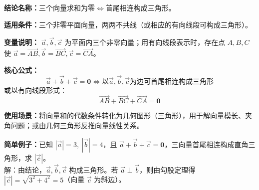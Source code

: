 \textbf{结论名称：}三个向量求和为零\(\iff\)首尾相连构成三角形。

\textbf{适用条件：}三个非零平面向量，两两不共线（或相应的有向线段可构成三角形）。

\textbf{变量说明：} \(\vec{a},\vec{b},\vec{c}\) 为平面内三个非零向量；用有向线段表示时，存在点 \(A,B,C\) 使 \(\vec{a}=\overrightarrow{AB},\vec{b}=\overrightarrow{BC},\vec{c}=\overrightarrow{CA}\)。

\textbf{核心公式：}
\[
\boxed{\vec{a} + \vec{b} + \vec{c} = \mathbf{0} \iff \text{以}\vec{a},\vec{b},\vec{c}\text{为边可首尾相连构成三角形}}
\]
或以有向线段形式：
\[
\boxed{\overrightarrow{AB} + \overrightarrow{BC} + \overrightarrow{CA} = \mathbf{0}}
\]

\textbf{使用场景：}将向量和的代数条件转化为几何图形（三角形），用于解向量模长、夹角问题；或由几何三角形反推向量线性关系。

\textbf{简单例子：}已知 \(|\vec{a}|=3,\ |\vec{b}|=4\)，且 \(\vec{a}+\vec{b}+\vec{c}=\mathbf{0}\)，三向量首尾相连构成直角三角形，求 \(|\vec{c}|\)。\\
解：由结论，\(\vec{a},\vec{b},\vec{c}\) 构成三角形。若 \(\vec{a}\perp\vec{b}\)，则由勾股定理得 \(|\vec{c}|=\sqrt{3^2+4^2}=5\)（向量 \(\vec{c}\) 为斜边）。